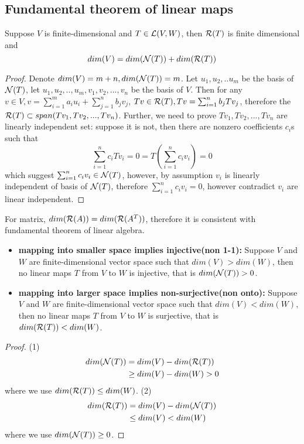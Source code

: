 \begin{refsection}
\subsection{Fundamental theorem of linear maps}
\begin{theorem}\label{ch:linearalgebra:th:ranknullitytheorem}
	\cite[62]{axler2015linear}Suppose $V$ is finite-dimensional and $T\in \mathcal{L}(V,W)$, then $\mathcal{R}(T)$ is finite dimensional and 
	$$dim(V) = dim(\mathcal{N}(T)) + dim(\mathcal{R}(T))$$
\end{theorem}
\begin{proof}
	Denote $dim(V)=m+n,dim(\mathcal{N}(T))=m$. Let $u_1,u_2,..u_m$ be the basis of $\mathcal{N}(T)$, let $u_1,u_2,..,u_m,v_1,v_2,...,v_n$ be the basis of $V$. Then for any $v\in V, v= \sum_{i=1}^m a_i u_i + \sum_{j=1}^n b_j v_j$, $Tv\in \mathcal{R}(T), Tv = \sum_{i=1}^n b_j Tv_j$, therefore the $\mathcal{R}(T) \subset span(Tv_1,Tv_2,...,Tv_n)$. Further, we need to prove $Tv_1,Tv_2,...,Tv_n$ are linearly independent set: suppose it is not, then there are nonzero coefficients $c_i$s such that  $$\sum_{i=1}^n c_i Tv_i = 0 = T(\sum_{i=1}^n c_i v_i) = 0$$
	which suggest $\sum_{i=1}^n c_i v_i \in \mathcal{N}(T)$, however, by assumption $v_i$ is linearly independent of basis of $\mathcal{N}(T)$, therefore $\sum_{i=1}^n c_i v_i = 0$, however contradict $v_i$ are linear independent.
\end{proof}


\begin{remark}
	For matrix, $dim(\mathcal{R}(A)) = dim(\mathcal{R}(A^T))$, therefore it is consistent with fundamental theorem of linear algebra.
\end{remark}


\begin{corollary}\cite[64]{axler2015linear}
\begin{itemize}
	\item \textbf{mapping into smaller space implies injective(non 1-1):} Suppose $V$ and $W$ are finite-dimensional vector space such that $dim(V) > dim(W)$, then no linear maps $T$ from $V$ to $W$ is injective, that is $dim(\mathcal{N}(T)) > 0$.
	\item \textbf{mapping into larger space implies non-surjective(non onto):} Suppose $V$ and $W$ are finite-dimensional vector space such that $dim(V) < dim(W)$, then no linear maps $T$ from $V$ to $W$ is surjective, that is $dim(\mathcal{R}(T)) < dim(W)$.
\end{itemize}	
\end{corollary}
\begin{proof}
(1)	
	\begin{align*}
	dim(\mathcal{N}(T)) &=  dim(V) - dim(\mathcal{R}(T)) \\
	&\geq dim(V) - dim(W) > 0
	\end{align*}
	where we use $dim(\mathcal{R}(T)) \leq dim(W)$.
(2)
		\begin{align*}
	dim(\mathcal{R}(T)) &=  dim(V) - dim(\mathcal{N}(T)) \\
	&\leq dim(V) < dim(W) 
	\end{align*}
	where we use $dim(\mathcal{N}(T)) \geq 0$.
\end{proof}



\end{refsection}
